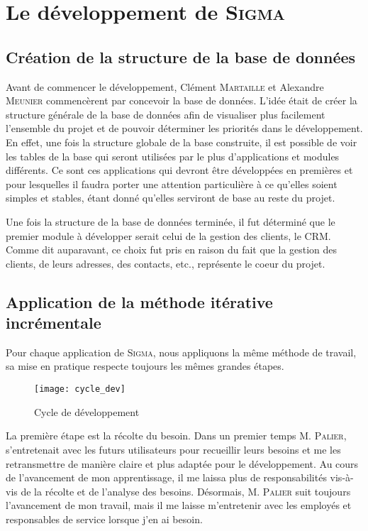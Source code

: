 \section{Le développement de \textsc{Sigma}}

\subsection{Création de la structure de la base de données}

Avant de commencer le développement, Clément \textsc{Martaille} et Alexandre \textsc{Meunier} commencèrent par concevoir la base de données.
L'idée était de créer la structure générale de la base de données afin de visualiser plus facilement l'ensemble du projet et de pouvoir déterminer les priorités dans le développement.
En effet, une fois la structure globale de la base construite, il est possible de voir les tables de la base qui seront utilisées par le plus d'applications et modules différents.
Ce sont ces applications qui devront être développées en premières et pour lesquelles il faudra porter une attention particulière à ce qu'elles soient simples et stables, étant donné qu'elles serviront de base au reste du projet.

Une fois la structure de la base de données terminée, il fut déterminé que le premier module à développer serait celui de la gestion des clients, le CRM.
Comme dit auparavant, ce choix fut pris en raison du fait que la gestion des clients, de leurs adresses, des contacts, etc., représente le coeur du projet.

\subsection{Application de la méthode itérative incrémentale}

Pour chaque application de \textsc{Sigma}, nous appliquons la même méthode de travail, sa mise en pratique respecte toujours les mêmes grandes étapes.

\FloatBarrier
\begin{figure}[h!]
    \begin{center}
        \texttt{[image: cycle\_dev]}
    \end{center}
    \caption{Cycle de développement}
    \label{figure:cycle_dev}
\end{figure}
\FloatBarrier

La première étape est la récolte du besoin.
Dans un premier temps M. \textsc{Palier}, s'entretenait avec les futurs utilisateurs pour recueillir leurs besoins et me les retransmettre de manière claire et plus adaptée pour le développement.
Au cours de l'avancement de mon apprentissage, il me laissa plus de responsabilités vis-à-vis de la récolte et de l'analyse des besoins.
Désormais, M. \textsc{Palier} suit toujours l'avancement de mon travail, mais il me laisse m'entretenir avec les employés et responsables de service lorsque j'en ai besoin.

